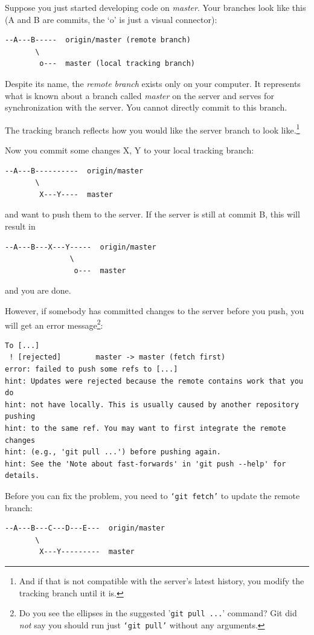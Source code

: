 \documentclass[12pt,pdftex]{article}
\begin{document}
Suppose you just started developing code on \emph{master}.
Your branches look like this (A and B are commits, the `o' is just
a visual connector):
\begin{verbatim}
--A---B-----  origin/master (remote branch)
       \
        o---  master (local tracking branch)
\end{verbatim}


\bigskip

Despite its name, the \emph{remote branch} exists only on your computer.
It represents what is known about a branch called \emph{master} on the
server and serves for synchronization with the server.
You cannot directly commit to this branch.

The tracking branch reflects how you would like the server branch to
look like.\footnote{And if that is not compatible with the server's latest history, you
modify the tracking branch until it is.}


\bigskip


Now you commit some changes X, Y to your local tracking branch:
\begin{verbatim}
--A---B----------  origin/master
       \
        X---Y----  master
\end{verbatim}
and want to push them to the server.
If the server is still at commit B, this will result in
\begin{verbatim}
--A---B---X---Y-----  origin/master
               \
                o---  master
\end{verbatim}
and you are done.

However, if somebody has committed changes to the server before you
push, you will get an error message\footnote{Do you see the ellipses in the suggested '\texttt{git pull ...}' command?
Git did \emph{not} say you should run just \texttt{‘git pull’} without any arguments.}:

{\small
\begin{verbatim}
To [...]
 ! [rejected]        master -> master (fetch first)
error: failed to push some refs to [...]
hint: Updates were rejected because the remote contains work that you do
hint: not have locally. This is usually caused by another repository pushing
hint: to the same ref. You may want to first integrate the remote changes
hint: (e.g., 'git pull ...') before pushing again.
hint: See the 'Note about fast-forwards' in 'git push --help' for details.
\end{verbatim}
}

Before you can fix the problem, you need to \texttt{‘git fetch’} to update the
remote branch:
\begin{verbatim}
--A---B---C---D---E---  origin/master
       \
        X---Y---------  master
\end{verbatim}
\end{document}
